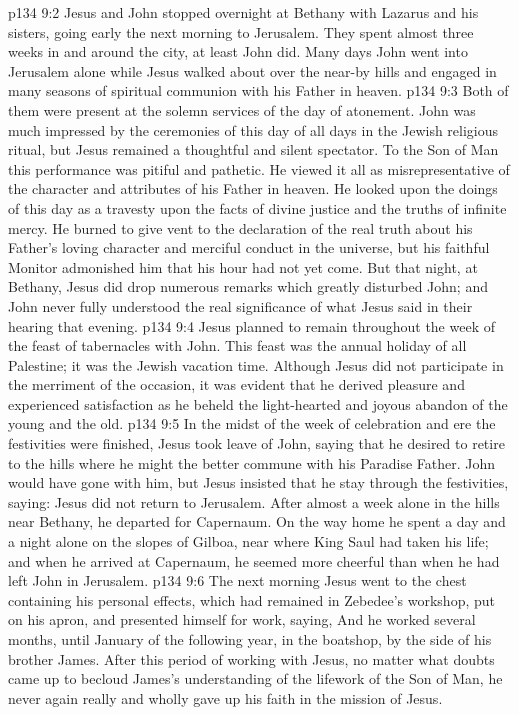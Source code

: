 \vs p134 9:2 Jesus and John stopped overnight at Bethany with Lazarus and his sisters, going early the next morning to Jerusalem. They spent almost three weeks in and around the city, at least John did. Many days John went into Jerusalem alone while Jesus walked about over the near\hyp{}by hills and engaged in many seasons of spiritual communion with his Father in heaven.
\vs p134 9:3 Both of them were present at the solemn services of the day of atonement. John was much impressed by the ceremonies of this day of all days in the Jewish religious ritual, but Jesus remained a thoughtful and silent spectator. To the Son of Man this performance was pitiful and pathetic. He viewed it all as misrepresentative of the character and attributes of his Father in heaven. He looked upon the doings of this day as a travesty upon the facts of divine justice and the truths of infinite mercy. He burned to give vent to the declaration of the real truth about his Father’s loving character and merciful conduct in the universe, but his faithful Monitor admonished him that his hour had not yet come. But that night, at Bethany, Jesus did drop numerous remarks which greatly disturbed John; and John never fully understood the real significance of what Jesus said in their hearing that evening.
\vs p134 9:4 Jesus planned to remain throughout the week of the feast of tabernacles with John. This feast was the annual holiday of all Palestine; it was the Jewish vacation time. Although Jesus did not participate in the merriment of the occasion, it was evident that he derived pleasure and experienced satisfaction as he beheld the light\hyp{}hearted and joyous abandon of the young and the old.
\vs p134 9:5 In the midst of the week of celebration and ere the festivities were finished, Jesus took leave of John, saying that he desired to retire to the hills where he might the better commune with his Paradise Father. John would have gone with him, but Jesus insisted that he stay through the festivities, saying:  Jesus did not return to Jerusalem. After almost a week alone in the hills near Bethany, he departed for Capernaum. On the way home he spent a day and a night alone on the slopes of Gilboa, near where King Saul had taken his life; and when he arrived at Capernaum, he seemed more cheerful than when he had left John in Jerusalem.
\vs p134 9:6 The next morning Jesus went to the chest containing his personal effects, which had remained in Zebedee’s workshop, put on his apron, and presented himself for work, saying,  And he worked several months, until January of the following year, in the boatshop, by the side of his brother James. After this period of working with Jesus, no matter what doubts came up to becloud James’s understanding of the lifework of the Son of Man, he never again really and wholly gave up his faith in the mission of Jesus.
